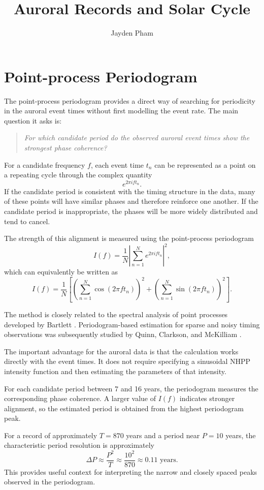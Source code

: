 \documentclass{article}
\title{Auroral Records and Solar Cycle}
\author{Jayden Pham}
\begin{document}
\maketitle

\section{Point-process Periodogram}

The point-process periodogram provides a direct way of searching for periodicity in the auroral event times without first modelling the event rate. The main question it asks is:

\begin{quote}
\textit{For which candidate period do the observed auroral event times show the strongest phase coherence?}
\end{quote}

For a candidate frequency $f$, each event time $t_n$ can be represented as a point on a repeating cycle through the complex quantity
$$e^{2\pi i f t_n}.$$
If the candidate period is consistent with the timing structure in the data, many of these points will have similar phases and therefore reinforce one another. If the candidate period is inappropriate, the phases will be more widely distributed and tend to cancel.

The strength of this alignment is measured using the point-process periodogram
$$I(f) = \frac{1}{N}\left|\sum_{n=1}^{N} e^{2\pi i f t_n}\right|^2,$$
which can equivalently be written as
$$I(f) = \frac{1}{N}\left[\left(\sum_{n=1}^{N}\cos(2\pi f t_n)\right)^2 + \left(\sum_{n=1}^{N}\sin(2\pi f t_n)\right)^2\right].$$

The method is closely related to the spectral analysis of point processes developed by Bartlett \cite{bartlett1963}. Periodogram-based estimation for sparse and noisy timing observations was subsequently studied by Quinn, Clarkson, and McKilliam \cite{quinn2013}.

The important advantage for the auroral data is that the calculation works directly with the event times. It does not require specifying a sinusoidal NHPP intensity function and then estimating the parameters of that intensity.

For each candidate period between 7 and 16 years, the periodogram measures the corresponding phase coherence. A larger value of $I(f)$ indicates stronger alignment, so the estimated period is obtained from the highest periodogram peak.

For a record of approximately $T = 870$ years and a period near $P = 10$ years, the characteristic period resolution is approximately
$$\Delta P \approx \frac{P^2}{T} \approx \frac{10^2}{870} \approx 0.11 \text{ years}.$$
This provides useful context for interpreting the narrow and closely spaced peaks observed in the periodogram.
\end{document}
